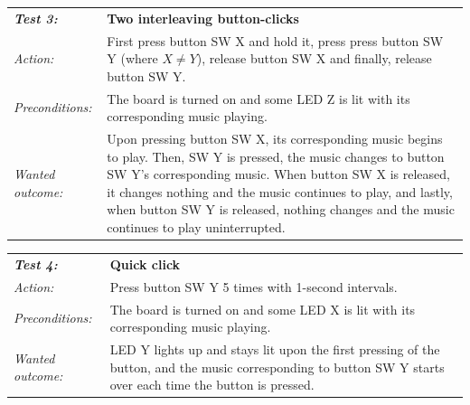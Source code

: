 \documentclass[a4paper,12pt]{article}
\begin{document}
\begin{tabular}[h]{|lp{12cm}|} \hline
\textbf{\emph{Test 3:}} 		& \textbf{Two interleaving button-clicks}\\
\emph{Action:} 		& First press button SW X and hold it, press press button SW Y (where $X \neq Y$), release button SW X and finally, release button SW Y. \\
\emph{Preconditions:}	& The board is turned on and some LED Z is lit with its corresponding music playing.\\
\emph{Wanted outcome:}	& Upon pressing button SW X, its corresponding music begins to play. Then, SW Y is pressed, the music changes to button SW Y's corresponding music. When button SW X is released, it changes nothing and the music continues to play, and lastly, when button SW Y is released, nothing changes and the music continues to play uninterrupted. \\ \hline
\end{tabular}
\vspace{1cm}

\begin{tabular}[h]{|lp{12cm}|} \hline
\textbf{\emph{Test 4:}} 		& \textbf{Quick click}\\
\emph{Action:} 		& Press button SW Y 5 times with 1-second intervals.\\
\emph{Preconditions:}	& The board is turned on and some LED X is lit with its corresponding music playing.\\
\emph{Wanted outcome:}	& LED Y lights up and stays lit upon the first pressing of the button, and the music corresponding to button SW Y starts over each time the button is pressed.\\ \hline
\end{tabular}
\end{document}
